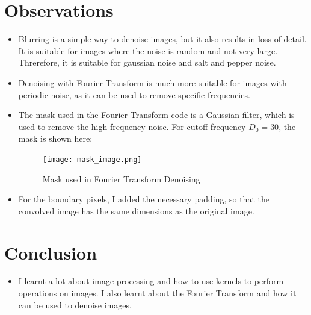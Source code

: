 \documentclass[12pt]{report}
\begin{document}
\section{Observations}
\begin{itemize}
    \item Blurring is a simple way to denoise images, but it also results in loss of detail. It is suitable for images where the noise is random and not very large. Threrefore, it is suitable for gaussian noise and salt and pepper noise.
    \item Denoising with Fourier Transform is much \href{https://stackoverflow.com/questions/34027840/removing-periodic-noise-from-an-image-using-the-fourier-transform}{more suitable for images with periodic noise}, as it can be used to remove specific frequencies.
    \item The mask used in the Fourier Transform code is a Gaussian filter, which is used to remove the high frequency noise. For cutoff frequency $D_0 = 30$, the mask is shown here:
          \begin{figure}[H]
              \centering
              \texttt{[image: mask\_image.png]}
              \caption{Mask used in Fourier Transform Denoising}
          \end{figure}
    \item For the boundary pixels, I added the necessary padding, so that the convolved image has the same dimensions as the original image.
\end{itemize}
\section{Conclusion}

\begin{itemize}
    \item I learnt a lot about image processing and how to use kernels to perform operations on images. I also learnt about the Fourier Transform and how it can be used to denoise images.
\end{itemize}

\printbibliography
\end{document}
